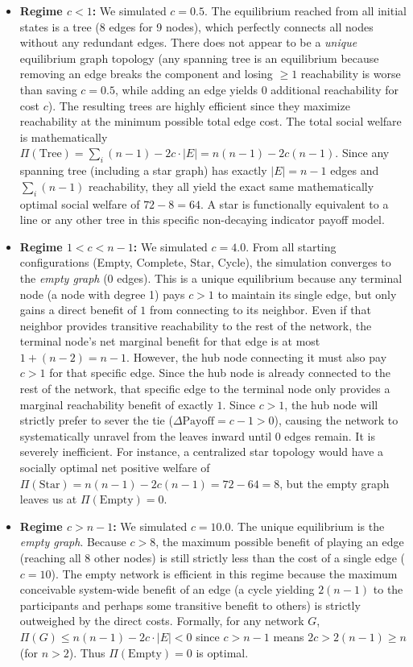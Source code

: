 \documentclass{article}
\begin{document}
\begin{itemize}
    \item \textbf{Regime $c < 1$:} We simulated $c=0.5$. The equilibrium reached from all initial states is a tree (8 edges for 9 nodes), which perfectly connects all nodes without any redundant edges. There does not appear to be a \textit{unique} equilibrium graph topology (any spanning tree is an equilibrium because removing an edge breaks the component and losing $\ge 1$ reachability is worse than saving $c=0.5$, while adding an edge yields 0 additional reachability for cost $c$). The resulting trees are highly efficient since they maximize reachability at the minimum possible total edge cost. The total social welfare is mathematically $\Pi(\text{Tree}) = \sum_i (n-1) - 2c \cdot |E| = n(n-1) - 2c(n-1)$. Since any spanning tree (including a star graph) has exactly $|E| = n-1$ edges and $\sum_i (n-1)$ reachability, they all yield the exact same mathematically optimal social welfare of $72 - 8 = 64$. A star is functionally equivalent to a line or any other tree in this specific non-decaying indicator payoff model.
    \item \textbf{Regime $1 < c < n-1$:} We simulated $c=4.0$. From all starting configurations (Empty, Complete, Star, Cycle), the simulation converges to the \textit{empty graph} (0 edges). This is a unique equilibrium because any terminal node (a node with degree 1) pays $c > 1$ to maintain its single edge, but only gains a direct benefit of $1$ from connecting to its neighbor. Even if that neighbor provides transitive reachability to the rest of the network, the terminal node's net marginal benefit for that edge is at most $1 + (n-2) = n-1$. However, the hub node connecting it must also pay $c > 1$ for that specific edge. Since the hub node is already connected to the rest of the network, that specific edge to the terminal node only provides a marginal reachability benefit of exactly $1$. Since $c > 1$, the hub node will strictly prefer to sever the tie ($\Delta\text{Payoff} = c - 1 > 0$), causing the network to systematically unravel from the leaves inward until 0 edges remain. It is severely inefficient. For instance, a centralized star topology would have a socially optimal net positive welfare of $\Pi(\text{Star}) = n(n-1) - 2c(n-1) = 72 - 64 = 8$, but the empty graph leaves us at $\Pi(\text{Empty}) = 0$.
    \item \textbf{Regime $c > n-1$:} We simulated $c=10.0$. The unique equilibrium is the \textit{empty graph}. Because $c > 8$, the maximum possible benefit of playing an edge (reaching all 8 other nodes) is still strictly less than the cost of a single edge ($c=10$). The empty network is efficient in this regime because the maximum conceivable system-wide benefit of an edge (a cycle yielding $2(n-1)$ to the participants and perhaps some transitive benefit to others) is strictly outweighed by the direct costs. Formally, for any network $G$, $\Pi(G) \le n(n-1) - 2c \cdot |E| < 0$ since $c > n-1$ means $2c > 2(n-1) \ge n$ (for $n>2$). Thus $\Pi(\text{Empty}) = 0$ is optimal.
\end{itemize}
\end{document}
